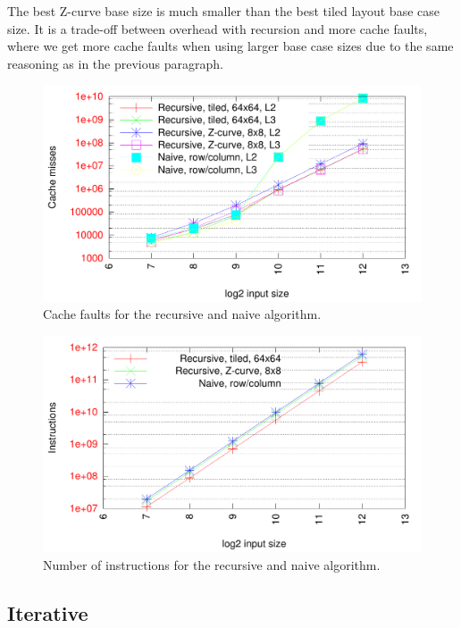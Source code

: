 The best Z-curve base size is much smaller than the best tiled layout base case size. It is a trade-off between overhead with recursion and more cache faults, where we get more cache faults when using larger base case sizes due to the same reasoning as in the previous paragraph.

\begin{figure}[h!]
  \centering
  \includegraphics[width=\textwidth]{"../project2/gnuplots/recursive_cache"}
  \caption{Cache faults for the recursive and naive algorithm.}
  \label{fig:recursive_layout_cachefaults}
\end{figure}

\begin{figure}[h!]
  \centering
  \includegraphics[width=\textwidth]{"../project2/gnuplots/recursive_instructions"}
  \caption{Number of instructions for the recursive and naive algorithm.}
  \label{fig:recursive_layout_instructions}
\end{figure}

\subsection{Iterative}

